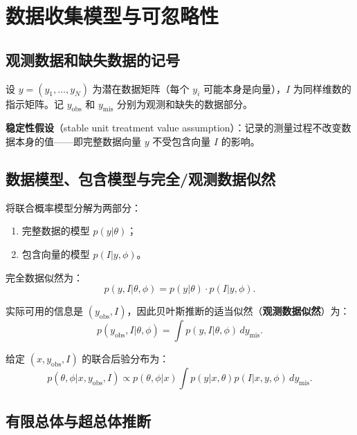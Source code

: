 \section{数据收集模型与可忽略性}

\subsection{观测数据和缺失数据的记号}

设 $y = (y_1, \ldots, y_N)$ 为潜在数据矩阵（每个 $y_i$ 可能本身是向量），$I$ 为同样维数的指示矩阵。记 $y_{\mathrm{obs}}$ 和 $y_{\mathrm{mis}}$ 分别为观测和缺失的数据部分。

\textbf{稳定性假设}（stable unit treatment value assumption）：记录的测量过程不改变数据本身的值——即完整数据向量 $y$ 不受包含向量 $I$ 的影响。

\subsection{数据模型、包含模型与完全/观测数据似然}

将联合概率模型分解为两部分：
\begin{enumerate}
  \item 完整数据的模型 $p(y|\theta)$；
  \item 包含向量的模型 $p(I|y,\phi)$。
\end{enumerate}

完全数据似然为：
\begin{equation}
p(y, I|\theta, \phi) = p(y|\theta) \cdot p(I|y, \phi). \label{eq:ch8-complete-data-likelihood}
\end{equation}

实际可用的信息是 $(y_{\mathrm{obs}}, I)$，因此贝叶斯推断的适当似然（\textbf{观测数据似然}）为：
\begin{equation}
p(y_{\mathrm{obs}}, I|\theta, \phi) = \int p(y, I|\theta, \phi) \, dy_{\mathrm{mis}}. \label{eq:ch8-observed-data-likelihood}
\end{equation}

给定 $(x, y_{\mathrm{obs}}, I)$ 的联合后验分布为：
\begin{equation}
p(\theta, \phi|x, y_{\mathrm{obs}}, I) \propto p(\theta, \phi|x) \int p(y|x, \theta) p(I|x, y, \phi) \, dy_{\mathrm{mis}}. \label{eq:ch8-joint-posterior}
\end{equation}

\subsection{有限总体与超总体推断}

